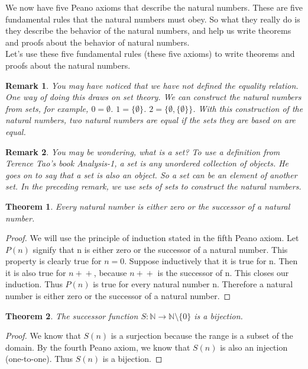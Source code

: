 \documentclass{article}
\newtheorem{theorem}{Theorem}
\newtheorem{remark}{Remark}
\newcommand{\inc}[1]{#1\!+\!+}
\begin{document}
We now have five Peano axioms that describe the natural numbers. These are five fundamental rules that the natural numbers must obey. So what they really do is they describe the behavior of the natural numbers, and help us write theorems and proofs about the behavior of natural numbers. \\

Let's use these five fundamental rules (these five axioms) to write theorems and proofs about the natural numbers. 

\begin{remark}
You may have noticed that we have not defined the equality relation. One way of doing this draws on set theory. We can construct the natural numbers from sets, for example, $0 = \emptyset$. $1 = \{\emptyset\}$. $2 = \{\emptyset, \{\emptyset\}\}$. With this construction of the natural numbers, two natural numbers are equal if the sets they are based on are equal. 
\end{remark}

\begin{remark}
You may be wondering, what is a set? To use a definition from Terence Tao's book Analysis-1, a set is any unordered collection of objects. He goes on to say that a set is also an object. So a set can be an element of another set. In the preceding remark, we use sets of sets to construct the natural numbers.
\end{remark}

\begin{theorem}
Every natural number is either zero or the successor of a natural number.
\end{theorem}

\begin{proof}
We will use the principle of induction stated in the fifth Peano axiom. Let $P(n)$ signify that n is either zero or the successor of a natural number. This property is clearly true for $n = 0$. Suppose inductively that it is true for n. Then it is also true for $\inc{n}$, because $\inc{n}$ is the successor of n. This closes our induction. Thus $P(n)$ is true for every natural number n. Therefore a natural number is either zero or the successor of a natural number.
\end{proof}

\begin{theorem}
The successor function $S : \mathbb{N} \to \mathbb{N}\setminus\{0\}$ is a bijection.
\end{theorem}

\begin{proof}
We know that $S(n)$ is a surjection because the range is a subset of the domain. By the fourth Peano axiom, we know that $S(n)$ is also an injection (one-to-one). Thus $S(n)$ is a bijection.
\end{proof}
\end{document}
